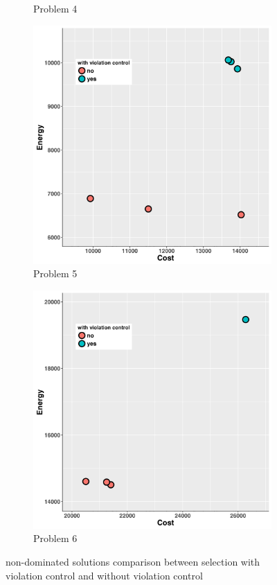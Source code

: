 \begin{figure}
\begin{subfigure}[b]{0.45\textwidth}
   \caption{Problem 4}
   \label{fig:d}
   \end{subfigure}
   \begin{subfigure}[b]{0.45\textwidth}\includegraphics[width=\textwidth]{pics/preliminary/5/evolve.png}
   \caption{Problem 5}
   \label{fig:e}
   \end{subfigure}
     \begin{subfigure}[b]{0.45\textwidth}\includegraphics[width=\textwidth]{pics/preliminary/6/evolve.png}
   \caption{Problem 6}
   \label{fig:f}
   \end{subfigure}
   \caption{non-dominated solutions comparison between selection with violation control and without violation control}
   \label{fig:dynamicFunctions}
\end{figure}


